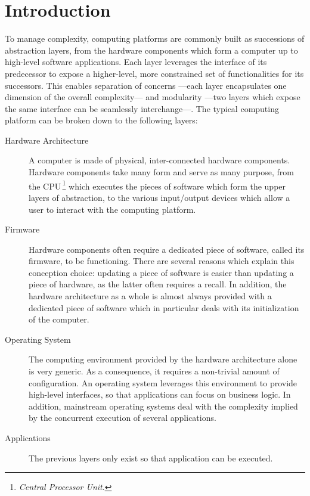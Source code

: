\chapter{Introduction}


\vspace{1cm}\noindent To manage complexity, computing platforms are commonly
built as successions of abstraction layers, from the hardware components which
form a computer up to high-level software applications.
%
Each layer leverages the interface of its predecessor to expose a higher-level,
more constrained set of functionalities for its successors.
%
This enables separation of concerns ---each layer encapsulates one dimension of
the overall complexity--- and modularity ---two layers which expose the same
interface can be seamlessly interchange---.
%
The typical computing platform can be broken down to the following layers:
%
\begin{description}
\item [Hardware Architecture]
  A computer is made of physical, inter-connected hardware components. Hardware
  components take many form and serve as many purpose, from the
  CPU\,\footnote{\emph{Central Processor Unit}.} which executes the pieces of
  software which form the upper layers of abstraction, to the various
  input/output devices which allow a user to interact with the computing
  platform.
\item [Firmware]
  Hardware components often require a dedicated piece of software, called its
  firmware, to be functioning. There are several reasons which explain this
  conception choice: updating a piece of software is easier than updating a
  piece of hardware, as the latter often requires a recall.
  In addition, the hardware architecture as a whole is almost always provided
  with a dedicated piece of software which in particular deals with its
  initialization of the computer.
\item [Operating System]
  The computing environment provided by the hardware architecture alone is very
  generic.
  As a consequence, it requires a non-trivial amount of configuration.
  An operating system leverages this environment to provide high-level
  interfaces, so that applications can focus on business logic.
  In addition, mainstream operating systems deal with the complexity implied by
  the concurrent execution of several applications.
\item [Applications]
  The previous layers only exist so that application can be executed.
\end{description}

